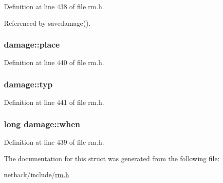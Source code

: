 Definition at line 438 of file rm.\+h.



Referenced by savedamage().

\hypertarget{structdamage_ae081f30fd293bc250a908e8d4e0971b7}{
\subsubsection[{place}]{ damage\+::place}}\label{structdamage_ae081f30fd293bc250a908e8d4e0971b7}


Definition at line 440 of file rm.\+h.

\hypertarget{structdamage_ac2d6d4c8df1fc9712a47662aa7506b9b}{
\subsubsection[{typ}]{ damage\+::typ}}\label{structdamage_ac2d6d4c8df1fc9712a47662aa7506b9b}


Definition at line 441 of file rm.\+h.

\hypertarget{structdamage_a6687c66d7fb711b93c07041046dd5617}{
\subsubsection[{when}]{\setlength{\rightskip}{0pt plus 5cm}long damage\+::when}}\label{structdamage_a6687c66d7fb711b93c07041046dd5617}


Definition at line 439 of file rm.\+h.



The documentation for this struct was generated from the following file\+:\begin{DoxyCompactItemize}
\item 
nethack/include/\hyperlink{rm_8h}{rm.\+h}\end{DoxyCompactItemize}
